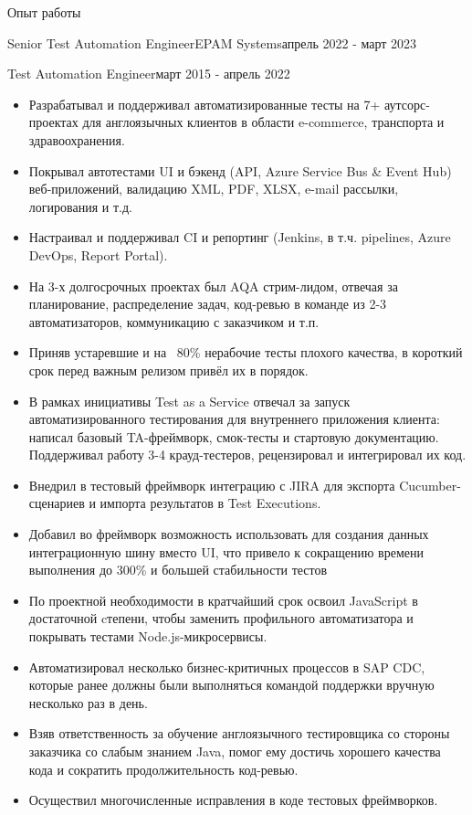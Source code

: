 \documentclass[]{cv}
\begin{document}
\raggedright

	\makeheader
	
	\begin{cvsection}{Опыт работы}
		\begin{cvsubsection}{Senior Test Automation Engineer}{EPAM Systems}{апрель 2022 - март 2023}
		\end{cvsubsection}
		\begin{cvsubsection}{Test Automation Engineer}{}{март 2015 - апрель 2022}
			\begin{itemize}
				\item Разрабатывал и поддерживал автоматизированные тесты на 7+ аутсорс-проектах для англоязычных клиентов в области e-commerce, транспорта и здравоохранения.
				\item Покрывал автотестами UI и бэкенд (API, Azure Service Bus \& Event Hub) веб-приложений, валидацию XML, PDF, XLSX, e-mail рассылки, логирования и т.д.
				\item Настраивал и поддерживал CI и репортинг (Jenkins, в т.ч. pipelines, Azure DevOps, Report Portal).
				\item На 3-х долгосрочных проектах был AQA стрим-лидом, отвечая за планирование, распределение задач, код-ревью в команде из 2-3 автоматизаторов, коммуникацию с заказчиком и т.п.
				\newline
				\item Приняв устаревшие и на ~80\% нерабочие тесты плохого качества, в короткий срок перед важным релизом привёл их в порядок.
				\item В рамках инициативы Test as a Service отвечал за запуск автоматизированного тестирования для внутреннего приложения клиента: написал базовый TA-фреймворк, смок-тесты и стартовую документацию. Поддерживал работу 3-4 крауд-тестеров, рецензировал и интегрировал их код.
				\item Внедрил в тестовый фреймворк интеграцию с JIRA для экспорта Cucumber-сценариев и импорта результатов в Test Executions.
				\item Добавил во фреймворк возможность использовать для создания данных интеграционную шину вместо UI, что привело к сокращению времени выполнения до 300\% и большей стабильности тестов
				\item По проектной необходимости в кратчайший срок освоил JavaScript в достаточной cтепени, чтобы заменить профильного автоматизатора и покрывать тестами Node.js-микросервисы.
				\item Автоматизировал несколько бизнес-критичных процессов в SAP CDC, которые ранее должны были выполняться командой поддержки вручную несколько раз в день.
				\item Взяв ответственность за обучение англоязычного тестировщика со стороны заказчика со слабым знанием Java, помог ему достичь хорошего качества кода и сократить продолжительность код-ревью.			
				\item Осуществил многочисленные исправления в коде тестовых фреймворков.
				

\end{itemize}
\end{cvsubsection}
\end{cvsection}
\end{document}
